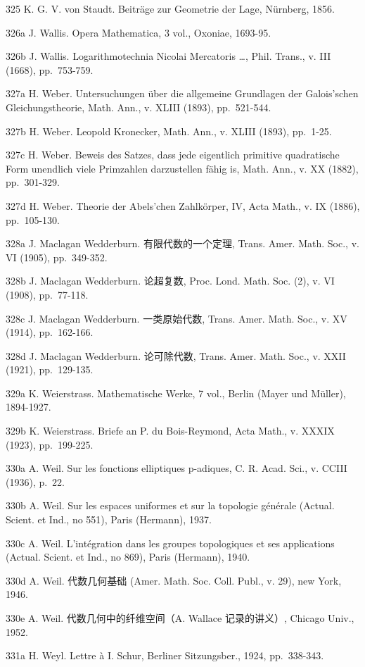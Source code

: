 325 K. G. V. von Staudt. Beiträge zur Geometrie der Lage, Nürnberg, 1856.

326a J. Wallis. Opera Mathematica, 3 vol., Oxoniae, 1693-95.

326b J. Wallis. Logarithmotechnia Nicolai Mercatoris \ldots, Phil. Trans., v. III (1668), pp.~753-759.

327a H. Weber. Untersuchungen über die allgemeine Grundlagen der Galois'schen Gleichungstheorie, Math. Ann., v. XLIII (1893), pp.~521-544.

327b H. Weber. Leopold Kronecker, Math. Ann., v. XLIII (1893), pp.~1-25.

327c H. Weber. Beweis des Satzes, dass jede eigentlich primitive quadratische Form unendlich viele Primzahlen darzustellen fähig is, Math. Ann., v. XX (1882), pp.~301-329.

327d H. Weber. Theorie der Abels'chen Zahlkörper, IV, Acta Math., v. IX (1886), pp.~105-130.

328a J. Maclagan Wedderburn. 有限代数的一个定理, Trans. Amer. Math. Soc., v. VI (1905), pp.~349-352.

328b J. Maclagan Wedderburn. 论超复数, Proc. Lond. Math. Soc. (2), v. VI (1908), pp.~77-118.

328c J. Maclagan Wedderburn. 一类原始代数, Trans. Amer. Math. Soc., v. XV (1914), pp.~162-166.

328d J. Maclagan Wedderburn. 论可除代数, Trans. Amer. Math. Soc., v. XXII (1921), pp.~129-135.

329a K. Weierstrass. Mathematische Werke, 7 vol., Berlin (Mayer und Müller), 1894-1927.

329b K. Weierstrass. Briefe an P. du Bois-Reymond, Acta Math., v. XXXIX (1923), pp.~199-225.

330a A. Weil. Sur les fonctions elliptiques p-adiques, C. R. Acad. Sci., v. CCIII (1936), p.~22.

330b A. Weil. Sur les espaces uniformes et sur la topologie générale (Actual. Scient. et Ind., no 551), Paris (Hermann), 1937.

330c A. Weil. L'intégration dans les groupes topologiques et ses applications (Actual. Scient. et Ind., no 869), Paris (Hermann), 1940.

330d A. Weil. 代数几何基础 (Amer. Math. Soc. Coll. Publ., v. 29), new York, 1946.

330e A. Weil. 代数几何中的纤维空间（A. Wallace 记录的讲义）, Chicago Univ., 1952.

331a H. Weyl. Lettre à I. Schur, Berliner Sitzungsber., 1924, pp.~338-343.

